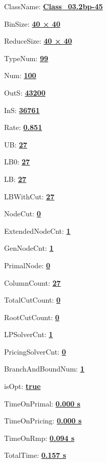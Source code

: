 \documentclass[11pt]{article}
\begin{document}
\pagestyle{empty}


ClassName: \underline{\textbf{Class_03.2bp-45}}
\par
BinSize: \underline{\textbf{40 × 40}}
\par
ReduceSize: \underline{\textbf{40 × 40}}
\par
TypeNum: \underline{\textbf{99}}
\par
Num: \underline{\textbf{100}}
\par
OutS: \underline{\textbf{43200}}
\par
InS: \underline{\textbf{36761}}
\par
Rate: \underline{\textbf{0.851}}
\par
UB: \underline{\textbf{27}}
\par
LB0: \underline{\textbf{27}}
\par
LB: \underline{\textbf{27}}
\par
LBWithCut: \underline{\textbf{27}}
\par
NodeCut: \underline{\textbf{0}}
\par
ExtendedNodeCnt: \underline{\textbf{1}}
\par
GenNodeCnt: \underline{\textbf{1}}
\par
PrimalNode: \underline{\textbf{0}}
\par
ColumnCount: \underline{\textbf{27}}
\par
TotalCutCount: \underline{\textbf{0}}
\par
RootCutCount: \underline{\textbf{0}}
\par
LPSolverCnt: \underline{\textbf{1}}
\par
PricingSolverCnt: \underline{\textbf{0}}
\par
BranchAndBoundNum: \underline{\textbf{1}}
\par
isOpt: \underline{\textbf{true}}
\par
TimeOnPrimal: \underline{\textbf{0.000 s}}
\par
TimeOnPricing: \underline{\textbf{0.000 s}}
\par
TimeOnRmp: \underline{\textbf{0.094 s}}
\par
TotalTime: \underline{\textbf{0.157 s}}
\par
\newpage


\end{document}
